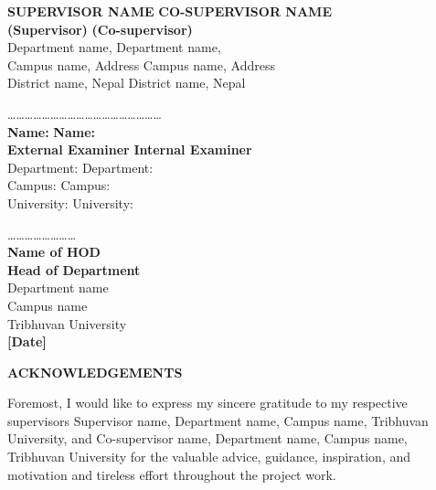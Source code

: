 \textbf{SUPERVISOR NAME} \hfill  \textbf{CO-SUPERVISOR NAME}\\
\textbf{(Supervisor)} \hfill  \textbf{(Co-supervisor)}\\
Department name, \hfill Department name,\\
Campus name, Address \hfill Campus name, Address\\
District name, Nepal \hfill District name, Nepal
\par
\dots\dots\dots\dots\dots\dots\dots\dots\dots \hfill \dots\dots\dots\dots\dots\dots\dots\dots\dots\\
\textbf{Name:} \hfill  \textbf{Name:\,\,\,\,\,\,\,\,\,\,\,\,\,\,\,\,\,\,\,\,\,\,\,\,\,\,\,\,\,\,\,\,\,\,\,\,\,\,\,\,\,\,\,\,\,\,\,\,\,\,\,\,\,\,\,\,}\\
\textbf{External Examiner} \hfill  \textbf{Internal Examiner}{{\,\,\,\,\,\,\,\,\,\,\,\,\,\,\,\,\,\,\,\,\,\,\,\,\,\,}}\\
{Department:} \hfill  {Department:\,\,\,\,\,\,\,\,\,\,\,\,\,\,\,\,\,\,\,\,\,\,\,\,\,\,\,\,\,\,\,\,\,\,\,\,\,\,\,\,\,\,}\\
{Campus:} \hfill  {Campus:\,\,\,\,\,\,\,\,\,\,\,\,\,\,\,\,\,\,\,\,\,\,\,\,\,\,\,\,\,\,\,\,\,\,\,\,\,\,\,\,\,\,\,\,\,\,\,\,\,\,\,}\\
{University:} \hfill  {University:\,\,\,\,\,\,\,\,\,\,\,\,\,\,\,\,\,\,\,\,\,\,\,\,\,\,\,\,\,\,\,\,\,\,\,\,\,\,\,\,\,\,\,\,\,}\\
\par
\begin{center}
\dots\dots\dots\dots\dots\dots\dots\dots\\
\textbf{Name of HOD} \\
\textbf{Head of Department}\\
Department name\\
Campus name\\ 
Tribhuvan University\\
\vfill
\textbf{[Date]}
\end{center}
\newpage
{}
{}
\centerline{\Large\bf ACKNOWLEDGEMENTS}
\vspace{2cm}
Foremost, I would like to express my sincere gratitude to my respective supervisors Supervisor name, Department name, Campus name, Tribhuvan University, and Co-supervisor name, Department name, Campus name, Tribhuvan University for the valuable advice, guidance, inspiration, and motivation and tireless effort throughout the project work.

